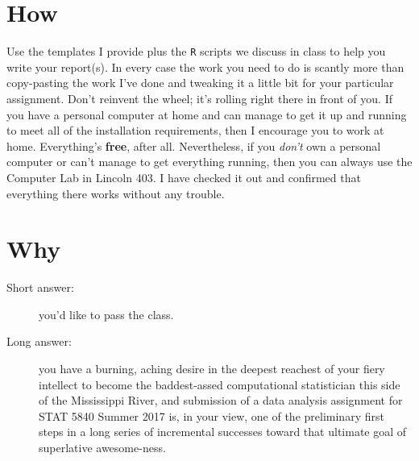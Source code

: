 \documentclass[10pt,english]{article}
\begin{document}
\section*{How}
\label{sec:orgheadline5}
Use the templates I provide plus the \texttt{R} scripts we discuss in class
to help you write your report(s).  In every case the work you need to
do is scantly more than copy-pasting the work I've done and tweaking
it a little bit for your particular assignment.  Don't reinvent the
wheel; it's rolling right there in front of you.  If you have a
personal computer at home and can manage to get it up and running to
meet all of the installation requirements, then I encourage you to
work at home.  Everything's \textbf{free}, after all.  Nevertheless, if you
\emph{don't} own a personal computer or can't manage to get everything
running, then you can always use the Computer Lab in Lincoln 403.  I
have checked it out and confirmed that everything there works without
any trouble.

\section*{Why}
\label{sec:orgheadline6}
\begin{description}
\item[{Short answer:}] you'd like to pass the class.
\item[{Long answer:}] you have a burning, aching desire in the deepest
reachest of your fiery intellect to become the
baddest-assed computational statistician this side
of the Mississippi River, and submission of a data
analysis assignment for STAT 5840 Summer 2017 is, in
your view, one of the preliminary first steps in a
long series of incremental successes toward that
ultimate goal of superlative awesome-ness.
\end{description}
\end{document}

